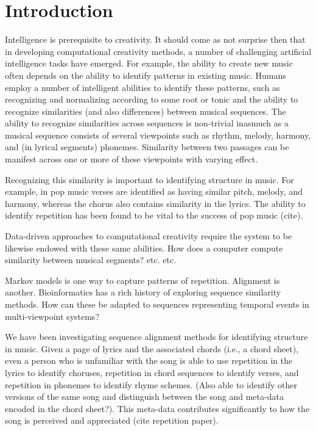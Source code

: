 \documentclass[12pt]{article}
\begin{document}
\section{Introduction}
Intelligence is prerequisite to creativity. It should come as not surprise then that in developing computational creativity methods, a number of challenging artificial intelligence tasks have emerged. For example, the ability to create new music often depends on the ability to identify patterns in existing music. Humans employ a number of intelligent abilities to identify these patterns, such as recognizing and normalizing according to some root or tonic and the ability to recognize similarities (and also differences) between musical sequences. The ability to recognize similarities across sequences is non-trivial inasmuch as a musical sequence consists of several viewpoints such as rhythm, melody, harmony, and (in lyrical segments) phonemes. Similarity between two passages can be manifest across one or more of these viewpoints with varying effect.

Recognizing this similarity is important to identifying structure in music. For example, in pop music verses are identified as having similar pitch, melody, and harmony, whereas the chorus also contains similarity in the lyrics. The ability to identify repetition has been found to be vital to the success of pop music (cite).

Data-driven approaches to computational creativity require the system to be likewise endowed with these same abilities. How does a computer compute similarity between musical segments? etc. etc. 

Markov models is one way to capture patterns of repetition. Alignment is another. Bioinformatics has a rich history of exploring sequence similarity methods. How can these be adapted to sequences representing temporal events in multi-viewpoint systems?

We have been investigating sequence alignment methods for identifying structure in music. Given a page of lyrics and the associated chords (i.e., a chord sheet), even a person who is unfamiliar with the song is able to use repetition in the lyrics to identify choruses, repetition in chord sequences to identify verses, and repetition in phonemes to identify rhyme schemes. (Also able to identify other versions of the same song and distinguish between the song and meta-data encoded in the chord sheet?). This meta-data contributes significantly to how the song is perceived and appreciated (cite repetition paper).
\end{document}

